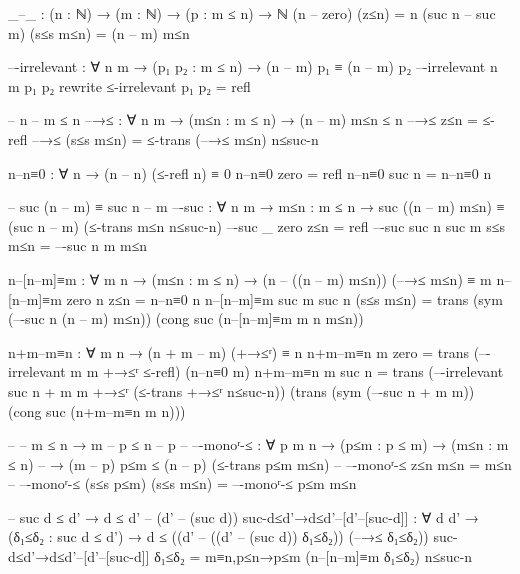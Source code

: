 \documentclass{article}
\begin{document}
\begin{prev}
\begin{code}
_–_ : (n : ℕ) → (m : ℕ) → (p : m ≤ n) → ℕ
(n – zero) (z≤n) = n
(suc n – suc m) (s≤s m≤n) = (n – m) m≤n

–-irrelevant : ∀ {n m} → (p₁ p₂ : m ≤ n) → (n – m) p₁ ≡ (n – m) p₂
–-irrelevant {n} {m} p₁ p₂ rewrite ≤-irrelevant p₁ p₂ = refl

-- n – m ≤ n
–→≤ : ∀ {n m} → (m≤n : m ≤ n) → (n – m) m≤n ≤ n
–→≤ z≤n = ≤-refl
–→≤ (s≤s m≤n) = ≤-trans (–→≤ m≤n) n≤suc-n

n–n≡0 : ∀ {n} → (n – n) (≤-refl {n}) ≡ 0
n–n≡0 {zero} = refl
n–n≡0 {suc n} = n–n≡0 {n}

-- suc (n – m) ­≡ suc n – m
–-suc : ∀ {n m} → {m≤n : m ≤ n} 
            → suc ((n – m) m≤n) ≡ (suc n – m) (≤-trans m≤n n≤suc-n)
–-suc {_} {zero} {z≤n} = refl
–-suc {suc n} {suc m} {s≤s m≤n} = –-suc {n} {m} {m≤n}

n–[n–m]≡m : ∀ {m n} → (m≤n : m ≤ n) 
                → (n – ((n – m) m≤n)) (–→≤ m≤n) ≡ m 
n–[n–m]≡m {zero} {n} z≤n = n–n≡0 {n}
n–[n–m]≡m {suc m} {suc n} (s≤s m≤n) = 
    trans (sym (–-suc {n} {(n – m) m≤n})) 
            (cong suc (n–[n–m]≡m {m} {n} m≤n))

n+m–m≡n : ∀ {m n} → (n + m – m) (+→≤ʳ) ≡ n
n+m–m≡n {m} {zero} = 
    trans (–-irrelevant {m} {m} +→≤ʳ ≤-refl) (n–n≡0 {m})
n+m–m≡n {m} {suc n} = 
    trans 
        (–-irrelevant {suc n + m} {m} +→≤ʳ (≤-trans +→≤ʳ n≤suc-n)) 
        (trans (sym (–-suc {n + m} {m})) 
                (cong suc (n+m–m≡n {m} {n})))

-- -- m ≤ n → m – p ≤ n – p
-- –-monoʳ-≤ : ∀ {p m n} → (p≤m : p ≤ m) → (m≤n : m ≤ n) 
--                 → (m – p) p≤m ≤ (n – p) (≤-trans p≤m m≤n)
-- –-monoʳ-≤ z≤n m≤n = m≤n
-- –-monoʳ-≤ (s≤s p≤m) (s≤s m≤n) = –-monoʳ-≤ p≤m m≤n

-- suc d ≤ d' → d ≤ d' – (d' – (suc d))
suc-d≤d'→d≤d'–[d'–[suc-d]] : ∀ {d d'} → (δ₁≤δ₂ : suc d ≤ d') 
            → d ≤ ((d' – ((d' – (suc d)) δ₁≤δ₂)) (–→≤ δ₁≤δ₂))
suc-d≤d'→d≤d'–[d'–[suc-d]] δ₁≤δ₂ = 
            m≡n,p≤n→p≤m (n–[n–m]≡m δ₁≤δ₂) n≤suc-n
\end{code}
\end{prev}
\end{document}
